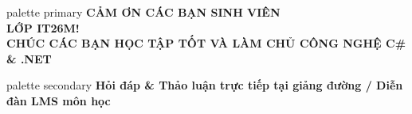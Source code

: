 \documentclass[aspectratio=169, 10pt]{beamer}
\begin{document}
\begin{frame}[plain]
  \vfill
  \centering
  \begin{beamercolorbox}[sep=8pt,center,shadow=true,rounded=true]{palette primary}
    \Huge \textbf{CẢM ƠN CÁC BẠN SINH VIÊN}\\[2mm]
    \Huge \textbf{LỚP IT26M!}\\[4mm]
    \large \textbf{CHÚC CÁC BẠN HỌC TẬP TỐT VÀ LÀM CHỦ CÔNG NGHỆ C\# \& .NET}
  \end{beamercolorbox}
  \vskip 6mm
  \begin{beamercolorbox}[sep=4pt,center]{palette secondary}
    \small \textbf{Hỏi đáp \& Thảo luận trực tiếp tại giảng đường / Diễn đàn LMS môn học}
  \end{beamercolorbox}
  \vfill
\end{frame}
\end{document}
